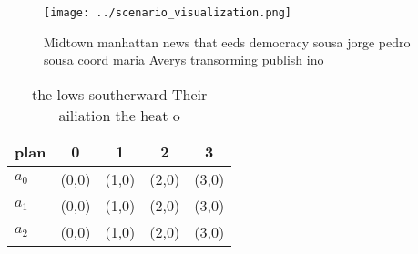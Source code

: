 \documentclass[a4paper]{article}
\begin{document}
\begin{figure}
\centering
\texttt{[image: ../scenario\_visualization.png]}
\caption{Midtown manhattan news that eeds democracy sousa jorge pedro sousa coord maria Averys transorming publish ino
}
\end{figure}
 
\begin{table}
\begin{adjustbox}{width=0.5\columnwidth}
\begin{tabular}{|l|l|l|l|l|}
\hline
\textbf{plan} & \multicolumn{1}{c|}{\textbf{0}} & \multicolumn{1}{c|}{\textbf{1}} & \multicolumn{1}{c|}{\textbf{2}} & \multicolumn{1}{c|}{\textbf{3}} \\ \hline
\textbf{$a_0$}  & (0,0) & (1,0) & (2,0) & (3,0) \\ \hline
\textbf{$a_1$}  & (0,0) & (1,0) & (2,0) & (3,0) \\ \hline
\textbf{$a_2$}  & (0,0) & (1,0) & (2,0) & (3,0) \\ \hline
\end{tabular}
\end{adjustbox}
\caption{ the lows southerward Their ailiation the heat o 
}
\end{table}
\end{document}
